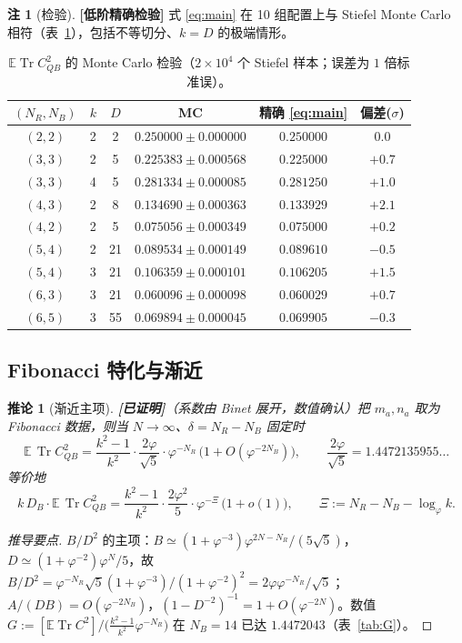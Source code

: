 \documentclass[11pt,a4paper]{ctexart}
\newtheorem{corollary}{推论}
\theoremstyle{definition}
\newtheorem{remark}{注}
\newcommand{\proved}{\textcolor{green!45!black}{\textbf{[已证明]}}}
\newcommand{\loword}{\textcolor{orange!80!black}{\textbf{[低阶精确检验]}}}
\newcommand{\Tr}{\operatorname{Tr}}
\newcommand{\E}{\mathbb{E}}
\newcommand{\ph}{\varphi}
\begin{document}
\begin{remark}[检验]\loword{} 式 \eqref{eq:main} 在 10 组配置上与 Stiefel Monte Carlo 相符（表~\ref{tab:partB}），包括不等切分、$k=D$ 的极端情形。
\end{remark}

\begin{table}[t]\centering
\caption{$\E\Tr C_{QB}^2$ 的 Monte Carlo 检验（$2\times10^4$ 个 Stiefel 样本；误差为 $1$ 倍标准误）。}
\label{tab:partB}
\begin{tabular}{cccccc}
\toprule
$(N_R,N_B)$ & $k$ & $D$ & MC & 精确 \eqref{eq:main} & 偏差($\sigma$)\\
\midrule
$(2,2)$ & 2 & 2 & $0.250000\pm0.000000$ & $0.250000$ & $0.0$\\
$(3,3)$ & 2 & 5 & $0.225383\pm0.000568$ & $0.225000$ & $+0.7$\\
$(3,3)$ & 4 & 5 & $0.281334\pm0.000085$ & $0.281250$ & $+1.0$\\
$(4,3)$ & 2 & 8 & $0.134690\pm0.000363$ & $0.133929$ & $+2.1$\\
$(4,2)$ & 2 & 5 & $0.075056\pm0.000349$ & $0.075000$ & $+0.2$\\
$(5,4)$ & 2 & 21 & $0.089534\pm0.000149$ & $0.089610$ & $-0.5$\\
$(5,4)$ & 3 & 21 & $0.106359\pm0.000101$ & $0.106205$ & $+1.5$\\
$(6,3)$ & 3 & 21 & $0.060096\pm0.000098$ & $0.060029$ & $+0.7$\\
$(6,5)$ & 3 & 55 & $0.069894\pm0.000045$ & $0.069905$ & $-0.3$\\
\bottomrule
\end{tabular}
\end{table}

\subsection{Fibonacci 特化与渐近}

\begin{corollary}[渐近主项]\proved{（系数由 Binet 展开，数值确认）}\label{cor:asymB}
把 $m_a,n_a$ 取为 Fibonacci 数据，则当 $N\to\infty$、$\delta=N_R-N_B$ 固定时
\begin{equation}\label{eq:asymTrC2}
\E\,\Tr C_{QB}^2=\frac{k^2-1}{k^2}\cdot\frac{2\ph}{\sqrt5}\cdot\ph^{-N_R}\,\big(1+O(\ph^{-2N_B})\big),
\qquad \frac{2\ph}{\sqrt5}=1.4472135955\ldots
\end{equation}
等价地
\begin{equation}\label{eq:asymXi}
k\,D_B\cdot\E\,\Tr C_{QB}^2=\frac{k^2-1}{k^2}\cdot\frac{2\ph^2}{5}\cdot\ph^{-\Xi}\,\big(1+o(1)\big),
\qquad \Xi:=N_R-N_B-\log_\ph k .
\end{equation}
\end{corollary}
\begin{proof}[推导要点]
$B/D^2$ 的主项：$B\simeq(1+\ph^{-3})\ph^{2N-N_R}/(5\sqrt5)$，$D\simeq(1+\ph^{-2})\ph^N/5$，故
$B/D^2=\ph^{-N_R}\sqrt5(1+\ph^{-3})/(1+\ph^{-2})^2=2\ph\ph^{-N_R}/\sqrt5$；$A/(DB)=O(\ph^{-2N_B})$，$(1-D^{-2})^{-1}=1+O(\ph^{-2N})$。数值 $G:=[\E\Tr C^2]/\big(\frac{k^2-1}{k^2}\ph^{-N_R}\big)$ 在 $N_B=14$ 已达 $1.4472043$（表~\ref{tab:G}）。
\end{proof}
\end{document}
